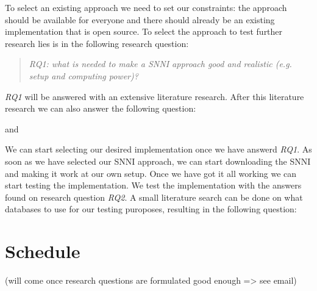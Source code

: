 \documentclass{uva-inf-article}
\begin{document}
To select an existing approach we need to set our constraints: the approach should be available for everyone and there should already be an existing implementation that is open source. To select the approach to test further research lies is in the following research question:
\begin{quote}\emph{RQ1: what is needed to make a SNNI approach good and realistic (e.g. setup and computing power)?}\end{quote}
\textit{RQ1} will be answered with an extensive literature research. After this literature research we can also answer the following question:
\begin{quote}\end{quote} and
\begin{quote}\end{quote}
We can start selecting our desired implementation once we have answerd \textit{RQ1}. As soon as we have selected our SNNI approach, we can start downloading the SNNI and making it work at our own setup. Once we have got it all working we can start testing the implementation. We test the implementation with the answers found on research question \textit{RQ2}. A small literature search can be done on what databases to use for our testing puroposes, resulting in the following question:
\begin{quote}\end{quote}

\section{Schedule} 
(will come once research questions are formulated good enough => see email)
% 



\newpage
\printbibliography

\end{document}

